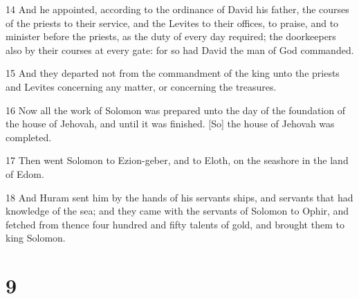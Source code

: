 \par 14 And he appointed, according to the ordinance of David his father, the courses of the priests to their service, and the Levites to their offices, to praise, and to minister before the priests, as the duty of every day required; the doorkeepers also by their courses at every gate: for so had David the man of God commanded.
\par 15 And they departed not from the commandment of the king unto the priests and Levites concerning any matter, or concerning the treasures.
\par 16 Now all the work of Solomon was prepared unto the day of the foundation of the house of Jehovah, and until it was finished. [So] the house of Jehovah was completed.
\par 17 Then went Solomon to Ezion-geber, and to Eloth, on the seashore in the land of Edom.
\par 18 And Huram sent him by the hands of his servants ships, and servants that had knowledge of the sea; and they came with the servants of Solomon to Ophir, and fetched from thence four hundred and fifty talents of gold, and brought them to king Solomon.

\chapter{9}

